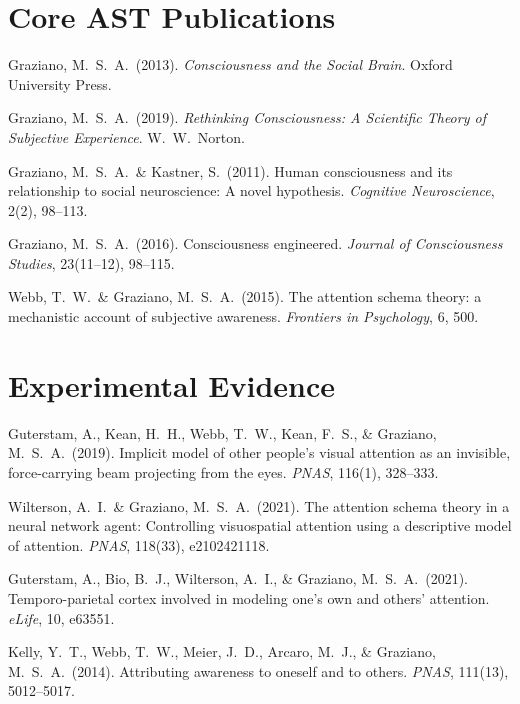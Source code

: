 \documentclass[11pt,a4paper]{report}
\begin{document}
\section*{Core AST Publications}
\begin{enumerate}[label={[\arabic*]}, leftmargin=2.5em]
  \item Graziano, M.\ S.\ A.\ (2013). \textit{Consciousness and the Social Brain}. Oxford University Press.
  \item Graziano, M.\ S.\ A.\ (2019). \textit{Rethinking Consciousness: A Scientific Theory of Subjective Experience}. W.\ W.\ Norton.
  \item Graziano, M.\ S.\ A.\ \& Kastner, S.\ (2011). Human consciousness and its relationship to social neuroscience: A novel hypothesis. \textit{Cognitive Neuroscience}, 2(2), 98--113.
  \item Graziano, M.\ S.\ A.\ (2016). Consciousness engineered. \textit{Journal of Consciousness Studies}, 23(11--12), 98--115.
  \item Webb, T.\ W.\ \& Graziano, M.\ S.\ A.\ (2015). The attention schema theory: a mechanistic account of subjective awareness. \textit{Frontiers in Psychology}, 6, 500.
\end{enumerate}

\section*{Experimental Evidence}
\begin{enumerate}[label={[\arabic*]}, leftmargin=2.5em, start=6]
  \item Guterstam, A., Kean, H.\ H., Webb, T.\ W., Kean, F.\ S., \& Graziano, M.\ S.\ A.\ (2019). Implicit model of other people's visual attention as an invisible, force-carrying beam projecting from the eyes. \textit{PNAS}, 116(1), 328--333.
  \item Wilterson, A.\ I.\ \& Graziano, M.\ S.\ A.\ (2021). The attention schema theory in a neural network agent: Controlling visuospatial attention using a descriptive model of attention. \textit{PNAS}, 118(33), e2102421118.
  \item Guterstam, A., Bio, B.\ J., Wilterson, A.\ I., \& Graziano, M.\ S.\ A.\ (2021). Temporo-parietal cortex involved in modeling one's own and others' attention. \textit{eLife}, 10, e63551.
  \item Kelly, Y.\ T., Webb, T.\ W., Meier, J.\ D., Arcaro, M.\ J., \& Graziano, M.\ S.\ A.\ (2014). Attributing awareness to oneself and to others. \textit{PNAS}, 111(13), 5012--5017.
\end{enumerate}
\end{document}
